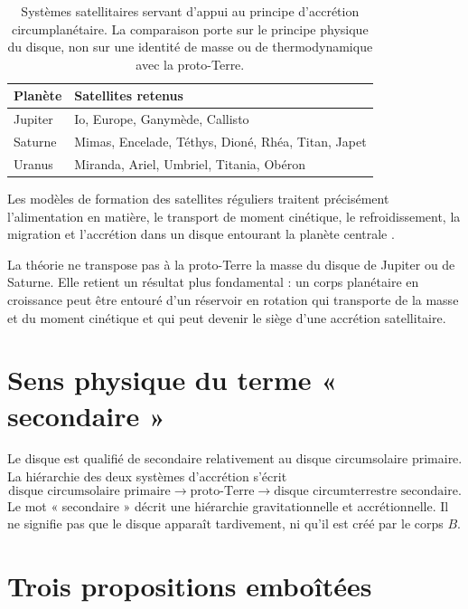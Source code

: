 \documentclass[11pt,a4paper,openany]{report}
\begin{document}
\begin{table}[htbp]
\centering
\caption{Systèmes satellitaires servant d'appui au principe d'accrétion circumplanétaire. La
comparaison porte sur le principe physique du disque, non sur une identité de masse ou de
thermodynamique avec la proto-Terre.}
\label{tab:systemes}
\begin{tabular}{ll}
\toprule
\textbf{Planète} & \textbf{Satellites retenus} \\
\midrule
Jupiter & Io, Europe, Ganymède, Callisto \\
Saturne & Mimas, Encelade, Téthys, Dioné, Rhéa, Titan, Japet \\
Uranus  & Miranda, Ariel, Umbriel, Titania, Obéron \\
\bottomrule
\end{tabular}
\end{table}

Les modèles de formation des satellites réguliers traitent précisément l'alimentation en
matière, le transport de moment cinétique, le refroidissement, la migration et l'accrétion dans
un disque entourant la planète centrale \cite{CanupWard2002,CanupWard2006,Nimmo2026}.

\begin{ideephys}
La théorie ne transpose pas à la proto-Terre la masse du disque de Jupiter ou de Saturne. Elle
retient un résultat plus fondamental : un corps planétaire en croissance peut être entouré d'un
réservoir en rotation qui transporte de la masse et du moment cinétique et qui peut devenir le
siège d'une accrétion satellitaire.
\end{ideephys}

\section{Sens physique du terme « secondaire »}

Le disque est qualifié de secondaire relativement au disque circumsolaire primaire. La
hiérarchie des deux systèmes d'accrétion s'écrit
\begin{equation}
\text{disque circumsolaire primaire}\longrightarrow\text{proto-Terre}\longrightarrow
\text{disque circumterrestre secondaire.}
\label{eq:hierarchie}
\end{equation}
Le mot « secondaire » décrit une hiérarchie gravitationnelle et accrétionnelle. Il ne signifie
pas que le disque apparaît tardivement, ni qu'il est créé par le corps $B$.


\section{Trois propositions emboîtées}
\end{document}
